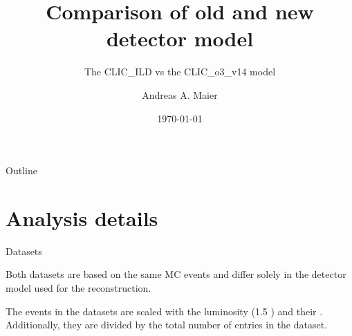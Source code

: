 \documentclass{beamer}
\title{Comparison of old and new detector model}
\subtitle{The CLIC\_ILD vs the CLIC\_o3\_v14 model}
\author{Andreas A. Maier\inst{1}}
\institute[CERN] %
{
  \inst{1}%
  CERN
}
\date{\today}
\newcommand{\texpath}{../analysis/tex/}
\begin{document}
\begin{frame}
  \titlepage
\end{frame}


















\begin{frame}{Outline}
  \begin{multicols}{2}
    \tableofcontents
  \end{multicols}
\end{frame}









\section{Analysis details}

\begin{frame}{Datasets}

\vspace{-0.5cm}
Both datasets are based on the same MC events and differ solely in the detector model used for the reconstruction.

The events in the datasets are scaled with the luminosity (1.5 \invab) and their \xsec.
%
Additionally, they are divided by the total number of entries in the dataset.

\end{frame}
\end{document}

